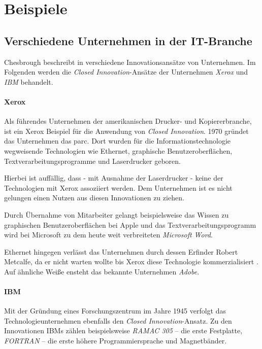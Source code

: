\section{Beispiele}\label{sec:beispiele}

\subsection{Verschiedene Unternehmen in der IT-Branche}\label{sec:beispiele-unternehmen}
Chesbrough beschreibt in \cite{chesbrough2003} verschiedene Innovationsansätze von Unternehmen.
Im Folgenden werden die \textit{Closed Innovation}-Ansätze der Unternehmen \textit{Xerox} und \textit{IBM} behandelt.

\paragraph{Xerox \cite[1\psqq]{chesbrough2003}}
Als führendes Unternehmen der amerikanischen Drucker- und Kopiererbranche,
ist ein Xerox Beispiel für die Anwendung von \textit{Closed Innovation}.
1970 gründet das Unternehmen das \ac{parc}.
Dort wurden für die Informationstechnologie wegweisende Technologien wie
Ethernet, graphische Benutzeroberflächen, Textverarbeitungsprogramme und Laserdrucker geboren.

Hierbei ist auffällig, dass - mit Ausnahme der Laserdrucker - keine der Technologien mit Xerox
assoziiert werden.
Dem Unternehmen ist es nicht gelungen einen Nutzen aus diesen Innovationen zu ziehen.

Durch Übernahme von Mitarbeiter gelangt beispielsweise das Wissen zu graphischen Benutzeroberflächen bei Apple
und das Textverarbeitungsprogramm wird bei Microsoft zu dem heute weit verbreiteten \textit{Microsoft Word}.

Ethernet hingegen verlässt das Unternehmen durch dessen Erfinder Robert Metcalfe,
da er nicht warten wollte bis Xerox diese Technologie kommerzialisiert \cite[81]{chesbrough2003}.
Auf ähnliche Weiße ensteht das bekannte Unternehmen \textit{Adobe}.



\paragraph{IBM \cite[93\psqq]{chesbrough2003}}
Mit der Gründung eines Forschungszentrum im Jahre 1945 verfolgt das Technologieunternehmen ebenfalls den \textit{Closed Innovation}-Ansatz.
Zu den Innovationen IBMs zählen beispielsweise
\textit{RAMAC 305} -- die erste Festplatte,
\textit{FORTRAN} -- die erste höhere Programmiersprache und
Magnetbänder.

